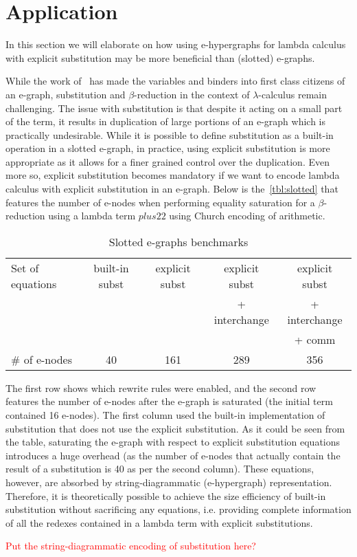 \section{Application}

In this section we will elaborate on how using e-hypergraphs for lambda calculus with explicit substitution may be more beneficial than (slotted) e-graphs.

While the work of~\cite{slotted-egraphs} has made the variables and binders into first class citizens of an e-graph, substitution and $\beta$-reduction in the context of $\lambda$-calculus remain challenging.
The issue with substitution is that despite it acting on a small part of the term, it results in duplication of large portions of an e-graph which is practically undesirable.
While it is possible to define substitution as a built-in operation in a slotted e-graph, in practice, using explicit substitution is more appropriate as it allows for a finer grained control over the duplication.
Even more so, explicit substitution becomes mandatory if we want to encode lambda calculus with explicit substitution in an e-graph.
Below is the~\autoref{tbl:slotted} that features the number of e-nodes when performing equality saturation for a $\beta$-reduction using a lambda term $plus 2 2$ using Church encoding of arithmetic.

\begin{table}
	\begin{tabular}{lcccc}
		Set of equations & built-in subst & explicit subst & explicit subst & explicit subst \\
		                 &                &                & + interchange  & + interchange  \\
		                 &                &                &                & + comm         \\
		\# of e-nodes    & 40             & 161            & 289            & 356
	\end{tabular}
	\caption{Slotted e-graphs benchmarks}
	\label{tbl:slotted}
\end{table}

The first row shows which rewrite rules were enabled, and the second row features the number of e-nodes after the e-graph is saturated (the initial term contained 16 e-nodes).
The first column used the built-in implementation of substitution that does not use the explicit substitution.
As it could be seen from the table, saturating the e-graph with respect to explicit substitution equations introduces a huge overhead (as the number of e-nodes that actually contain the result of a substitution is 40 as per the second column).
These equations, however, are absorbed by string-diagrammatic (e-hypergraph) representation. Therefore, it is theoretically possible to achieve the size efficiency of built-in substitution without sacrificing any equations, i.e. providing complete information of all the redexes contained in a lambda term with explicit substitutions.

\textcolor{red}{Put the string-diagrammatic encoding of substitution here?}

